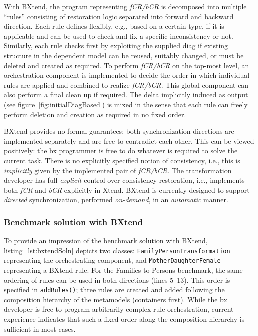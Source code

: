 With BXtend, the program representing \emph{fCR/bCR} is decomposed into multiple ``rules'' consisting of restoration logic separated into forward and backward direction.
Each rule defines flexibly, e.g., based on a certain type, if it is applicable and can be used to check and fix a specific inconsistency or not.
Similarly, each rule checks first by exploiting the supplied diag if existing structure in the dependent model can be reused, suitably changed, or must be deleted and created as required.
To perform \emph{fCR/bCR} on the top-most level, an orchestration component is implemented to decide the order in which individual rules are applied and combined to realize \emph{fCR/bCR}.
This global component can also perform a final clean up if required.
The delta implicitly induced as output (see figure~\ref{fig:initialDiagBased}) is mixed in the sense that each rule can freely perform deletion and creation as required in no fixed order.

BXtend provides no formal guarantees: both synchronization directions are implemented separately and are free to contradict each other.
This can be viewed positively: the bx programmer is free to do whatever is required to solve the current task.
%
There is no explicitly specified notion of consistency, i.e., this is \emph{implicitly} given by the implemented pair of \emph{fCR/bCR}.
%
The transformation developer has full \emph{explicit} control over consistency restoration, i.e., implements both \emph{fCR} and \emph{bCR} explicitly in Xtend.
%
BXtend is currently designed to support \emph{directed} synchronization, performed \emph{on-demand}, in an \emph{automatic} manner.

\subsubsection{Benchmark solution with BXtend}

To provide an impression of the benchmark solution with BXtend, listing~\ref{lst:bxtendSoln} depicts two classes:  \texttt{Family\-Person\-Transforma\-tion} representing the orchestrating component, and \texttt{Mother\-Daughter\-Female} representing a BXtend rule.
For the Families-to-Persons benchmark, the same ordering of rules can be used in both directions (lines 5--13).
This order is specified in \texttt{addRules()}; three rules are created and added following the composition hierarchy of the metamodels (containers first).
While the bx developer is free to program arbitrarily complex rule orchestration, current experience indicates that such a fixed order along the composition hierarchy is sufficient in most cases.


